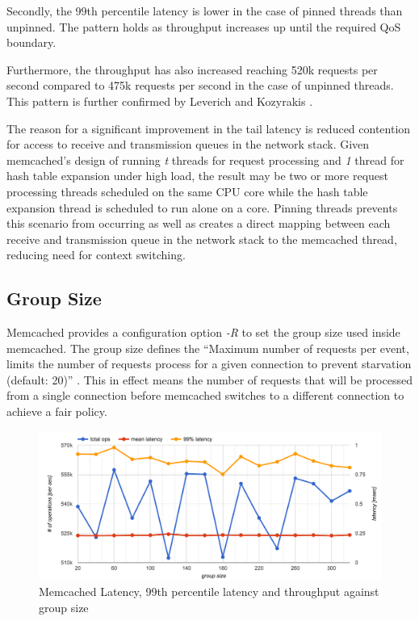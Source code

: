 Secondly, the 99th percentile latency is lower in the case of pinned threads than unpinned. The pattern holds as throughput increases up until the required QoS boundary.

Furthermore, the throughput has also increased reaching 520k requests per second compared to 475k requests per second in the case of unpinned threads. This pattern is further confirmed by  Leverich and Kozyrakis \cite{leverich2014reconciling}.

The reason for a significant improvement in the tail latency is reduced contention for access to receive and transmission queues in the network stack. Given memcached's design of running \textit{t} threads for request processing and \textit{1} thread for hash table expansion under high load, the result may be two or more request processing threads scheduled on the same CPU core while the hash table expansion thread is scheduled to run alone on a core. Pinning threads prevents this scenario from occurring as well as creates a direct mapping between each receive and transmission queue in the network stack to the memcached thread, reducing need for context switching.


\subsection{Group Size}
Memcached provides a configuration option \textit{-R} to set the group size used inside memcached. The group size defines the ``Maximum number of requests per event, limits the number of requests process for a given connection to prevent starvation (default: 20)'' \cite{interactive2006memcached}. This in effect means the number of requests that will be processed from a single connection before memcached switches to a different connection to achieve a fair policy.

\begin{figure}[h]
    \includegraphics[width=\textwidth]{./res/5_memcached_group_size.png}
    \caption{Memcached Latency, 99th percentile latency and throughput against group size}
    \label{fig:memcached_group_size}
\end{figure}
